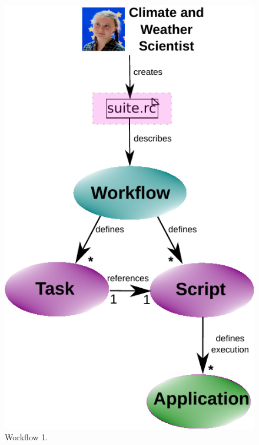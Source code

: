\documentclass[a4paper]{article}
\begin{document}
\begin{figure}[H]
  \centering
  \includegraphics[scale=0.6]{workflow1-v2}
  \caption{Workflow 1.}
  \label{fig:work1}
\end{figure}
\end{document}
